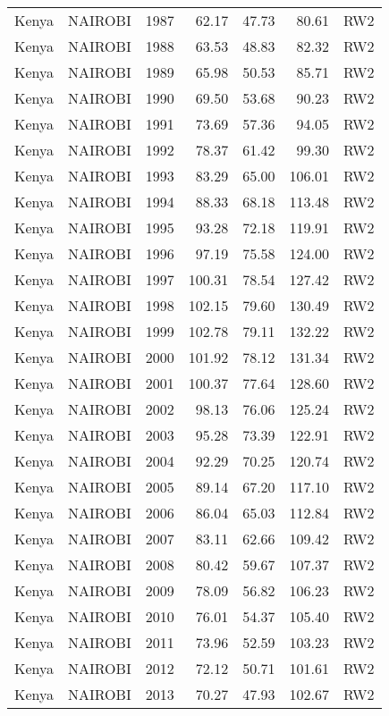 \begin{longtable}{lllrrrl}
  Kenya & NAIROBI & 1987 & 62.17 & 47.73 & 80.61 & RW2 \\ 
  Kenya & NAIROBI & 1988 & 63.53 & 48.83 & 82.32 & RW2 \\ 
  Kenya & NAIROBI & 1989 & 65.98 & 50.53 & 85.71 & RW2 \\ 
  Kenya & NAIROBI & 1990 & 69.50 & 53.68 & 90.23 & RW2 \\ 
  Kenya & NAIROBI & 1991 & 73.69 & 57.36 & 94.05 & RW2 \\ 
  Kenya & NAIROBI & 1992 & 78.37 & 61.42 & 99.30 & RW2 \\ 
  Kenya & NAIROBI & 1993 & 83.29 & 65.00 & 106.01 & RW2 \\ 
  Kenya & NAIROBI & 1994 & 88.33 & 68.18 & 113.48 & RW2 \\ 
  Kenya & NAIROBI & 1995 & 93.28 & 72.18 & 119.91 & RW2 \\ 
  Kenya & NAIROBI & 1996 & 97.19 & 75.58 & 124.00 & RW2 \\ 
  Kenya & NAIROBI & 1997 & 100.31 & 78.54 & 127.42 & RW2 \\ 
  Kenya & NAIROBI & 1998 & 102.15 & 79.60 & 130.49 & RW2 \\ 
  Kenya & NAIROBI & 1999 & 102.78 & 79.11 & 132.22 & RW2 \\ 
  Kenya & NAIROBI & 2000 & 101.92 & 78.12 & 131.34 & RW2 \\ 
  Kenya & NAIROBI & 2001 & 100.37 & 77.64 & 128.60 & RW2 \\ 
  Kenya & NAIROBI & 2002 & 98.13 & 76.06 & 125.24 & RW2 \\ 
  Kenya & NAIROBI & 2003 & 95.28 & 73.39 & 122.91 & RW2 \\ 
  Kenya & NAIROBI & 2004 & 92.29 & 70.25 & 120.74 & RW2 \\ 
  Kenya & NAIROBI & 2005 & 89.14 & 67.20 & 117.10 & RW2 \\ 
  Kenya & NAIROBI & 2006 & 86.04 & 65.03 & 112.84 & RW2 \\ 
  Kenya & NAIROBI & 2007 & 83.11 & 62.66 & 109.42 & RW2 \\ 
  Kenya & NAIROBI & 2008 & 80.42 & 59.67 & 107.37 & RW2 \\ 
  Kenya & NAIROBI & 2009 & 78.09 & 56.82 & 106.23 & RW2 \\ 
  Kenya & NAIROBI & 2010 & 76.01 & 54.37 & 105.40 & RW2 \\ 
  Kenya & NAIROBI & 2011 & 73.96 & 52.59 & 103.23 & RW2 \\ 
  Kenya & NAIROBI & 2012 & 72.12 & 50.71 & 101.61 & RW2 \\ 
  Kenya & NAIROBI & 2013 & 70.27 & 47.93 & 102.67 & RW2 \\ 

\end{longtable}
